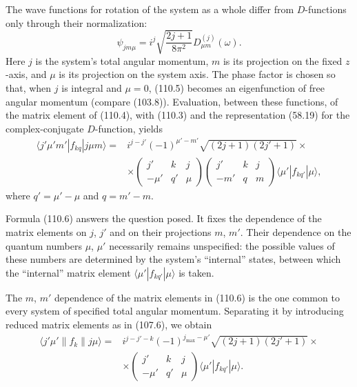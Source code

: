 The wave functions for rotation of the system as a whole differ from $D$-functions only through their normalization:
\begin{equation}
 \psi_{jm\mu}=i^j\sqrt{\frac{2j+1}{8\pi^2}}D^{(j)}_{\mu m}(\omega).
 \tag{110.5}
\end{equation}
Here $j$ is the system's total angular momentum, $m$ is its projection on the fixed $z$-axis, and $\mu$ is its projection on the system axis. The phase factor is chosen so that, when $j$ is integral and $\mu=0$, (110.5) becomes an eigenfunction of free angular momentum (compare (103.8)). Evaluation, between these functions, of the matrix element of (110.4), with (110.3) and the representation (58.19) for the complex-conjugate $D$-function, yields
\begin{equation}
 \begin{aligned}
 \langle j'\mu'm'|f_{kq}|j\mu m\rangle={}&i^{j-j'}(-1)^{\mu'-m'}
 \sqrt{(2j+1)(2j'+1)}\times\\
 &\times\begin{pmatrix}j'&k&j\\-\mu'&q'&\mu\end{pmatrix}
 \begin{pmatrix}j'&k&j\\-m'&q&m\end{pmatrix}
 \langle\mu'|f_{kq'}|\mu\rangle,
 \end{aligned}
 \tag{110.6}
\end{equation}
where $q'=\mu'-\mu$ and $q=m'-m$.

Formula (110.6) answers the question posed. It fixes the dependence of the matrix elements on $j$, $j'$ and on their projections $m$, $m'$. Their dependence on the quantum numbers $\mu$, $\mu'$ necessarily remains unspecified: the possible values of these numbers are determined by the system's ``internal'' states, between which the ``internal'' matrix element $\langle\mu'|f_{kq'}|\mu\rangle$ is taken.

The $m$, $m'$ dependence of the matrix elements in (110.6) is the one common to every system of specified total angular momentum. Separating it by introducing reduced matrix elements as in (107.6), we obtain
\begin{equation}
 \begin{aligned}
 \langle j'\mu'\|f_k\|j\mu\rangle={}&i^{j-j'-k}(-1)^{j_{\max}-\mu'}
 \sqrt{(2j+1)(2j'+1)}\times\\
 &\times\begin{pmatrix}j'&k&j\\-\mu'&q'&\mu\end{pmatrix}
 \langle\mu'|f_{kq'}|\mu\rangle.
 \end{aligned}
 \tag{110.7}
\end{equation}

